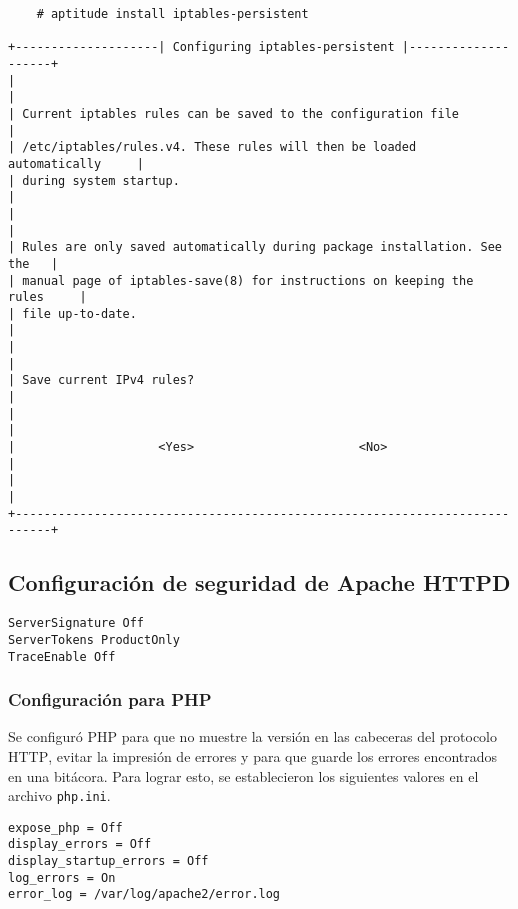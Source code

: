 {
\scriptsize
\linespread{1}
\begin{verbatim}
    # aptitude install iptables-persistent

+--------------------| Configuring iptables-persistent |--------------------+
|                                                                           |
| Current iptables rules can be saved to the configuration file             |
| /etc/iptables/rules.v4. These rules will then be loaded automatically     |
| during system startup.                                                    |
|                                                                           |
| Rules are only saved automatically during package installation. See the   |
| manual page of iptables-save(8) for instructions on keeping the rules     |
| file up-to-date.                                                          |
|                                                                           |
| Save current IPv4 rules?                                                  |
|                                                                           |
|                    <Yes>                       <No>                       |
|                                                                           |
+---------------------------------------------------------------------------+
\end{verbatim}
}

      \subsection {Configuraci\'{o}n de seguridad de Apache HTTPD}

{
\scriptsize
\linespread{1}
\begin{verbatim}
ServerSignature Off
ServerTokens ProductOnly
TraceEnable Off
\end{verbatim}
}

        \subsubsection{Configuraci\'{o}n para \textsc{PHP}}

Se configur\'{o} \textsc{PHP} para que no muestre la versi\'{o}n en las cabeceras del protocolo \textsc{HTTP}, evitar la impresi\'{o}n de errores y para que guarde los errores encontrados en una bit\'{a}cora. Para lograr esto, se establecieron los siguientes valores en el archivo \texttt{php.ini}.

{
\scriptsize
\linespread{1}
\begin{verbatim}
expose_php = Off
display_errors = Off
display_startup_errors = Off
log_errors = On
error_log = /var/log/apache2/error.log
\end{verbatim}
}

